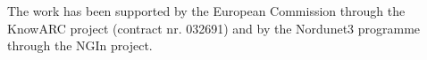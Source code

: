 \documentclass{llncs}
\begin{document}
The work has been supported by the European Commission through the KnowARC
project (contract nr. 032691) and by the Nordunet3 programme through the NGIn
project.







\end{document}
